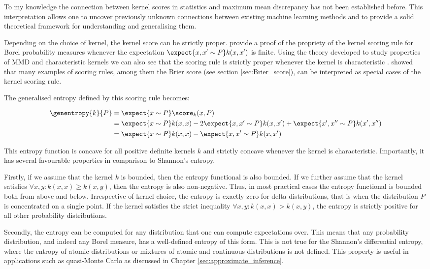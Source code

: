 To my knowledge the connection between kernel scores in statistics and maximum mean discrepancy has not been established before. This interpretation allows one to uncover previously unknown connections between existing machine learning methods and to provide a solid theoretical framework for understanding and generalising them.

Depending on the choice of kernel, the kernel score can be strictly proper. \citep{Gneiting2007} provide a proof of the propriety of the kernel scoring rule for Borel probability measures whenever the expectation $\expect{x,x'\sim P} k(x,x')$ is finite. Using the theory developed to study properties of MMD and characteristic kernels we can also see that the scoring rule is strictly proper whenever the kernel is characteristic \citep{Sripedimbudur}. \citep{Gneiting2007} showed that many examples of scoring rules, among them the Brier score (see section \ref{sec:Brier_score}), can be interpreted as special cases of the kernel scoring rule.

The generalised entropy defined by this scoring rule becomes:

\begin{align}
	\genentropy{k}{P} &= \expect{x\sim P} \score_{k}(x,P) \\
		&= \expect{x\sim P} k(x,x) - 2 \expect{x,x'\sim P} k(x,x') + \expect{x',x''\sim P}k(x',x'')\\
		&= \expect{x\sim P} k(x,x) - \expect{x,x'\sim P} k(x,x')
\end{align}

This entropy function is concave for all positive definite kernels $k$ and strictly concave whenever the kernel is characteristic. Importantly, it has several favourable properties in comparison to Shannon's entropy.

Firstly, if we assume that the kernel $k$ is bounded, then the entropy functional is also bounded. If we further assume that the kernel satisfies $\forall x,y: k(x,x)\geq k(x,y)$, then the entropy is also non-negative. Thus, in most practical cases the entropy functional is bounded both from above and below. Irrespective of kernel choice, the entropy is exactly zero for delta distributions, that is when the distribution $P$ is concentrated on a single point. If the kernel satisfies the strict inequality $\forall x,y: k(x,x) > k(x,y)$, the entropy is strictly positive for all other probability distributions.

Secondly, the entropy can be computed for any distribution that one can compute expectations over. This means that any probability distribution, and indeed any Borel measure, has a well-defined entropy of this form. This is not true for the Shannon's differential entropy, where the entropy of atomic distributions or mixtures of atomic and continuous distributions is not defined. This property is useful in applications such as quasi-Monte Carlo as discussed in Chapter \ref{sec:approximate_inference}.

